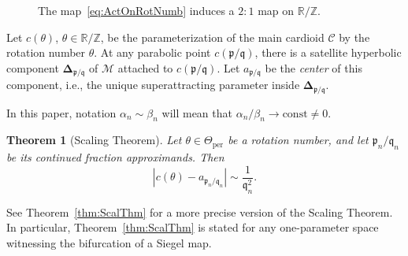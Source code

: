 \documentclass[]{amsart}
\newcommand\HH{\boldsymbol{\Delta}}%
\newcommand{\pp}{\mathfrak{p}}
\renewcommand{\qq}{\mathfrak{q}}
\newcommand{\R}{\mathbb{R}}
\newcommand{\Z}{\mathbb{Z}}
\newtheorem{thm}{Theorem}[section]
\theoremstyle{remark}
\numberwithin{equation}{section}
\theoremstyle{definition}
\newcommand{\Mandel}{{\mathcal{M}}}
\newcommand{\per}{{\mathrm{per}}}
\newcommand{\const}{\mathrm{const}}
\newcommand{\CC}{{\mathcal C}}
\begin{document}
\begin{figure}
\caption{The map~\eqref{eq:ActOnRotNumb} induces a $2:1$ map on $\R/\Z$.}
\label{Fg:eq:ActOnRotNumb}
\end{figure}



 Let $c(\theta)$, $\theta\in \R/\Z$,  be the parameterization of the main cardioid $\CC$ by the rotation number 
$\theta$. At any parabolic point $c(\pp/\qq)$, there is a satellite hyperbolic component $\HH_{\pp/\qq}$ of $\Mandel$
  attached to $c(\pp/\qq)$.  Let $a_{\pp/\qq}$ be the {\em center} of this component, i.e., the unique superattracting
parameter inside $\HH_{\pp/\qq} $. 

In this paper, 
notation $ \alpha_n \sim \beta_n$  will mean that  $\alpha_n/\beta_n \to \const \not= 0 $. 

\begin{thm}[Scaling Theorem]\label{scaling thm}
  Let $\theta\in \Theta_\per$ be a  rotation number,
and let $\pp_n/\qq_n$ be its continued fraction approximands. 
Then 
\[
  | c(\theta)  - a_{\pp_n/\qq_n}  | \sim \frac 1 {\qq_n^2 } . 
\]  
\end{thm}   
\noindent See Theorem~\ref{thm:ScalThm} for a more precise version of the Scaling Theorem. In particular, Theorem~\ref{thm:ScalThm} is stated for any one-parameter space witnessing the bifurcation of a Siegel map.
\end{document}
